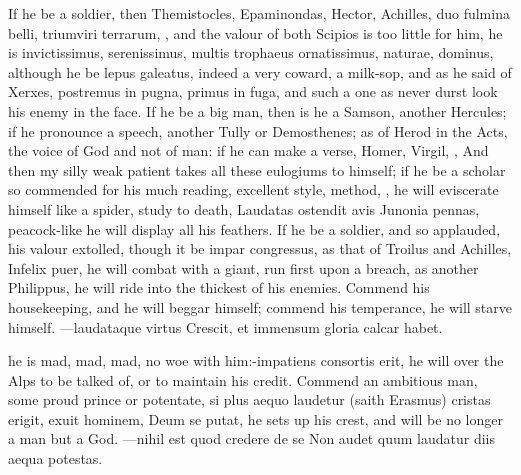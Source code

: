 {If he be a soldier, then Themistocles, Epaminondas, Hector, Achilles,
duo fulmina belli, triumviri terrarum, \etc{}, and the valour of both
Scipios is too little for him, he is invictissimus, serenissimus,
multis trophaeus ornatissimus, naturae, dominus, although he be lepus
galeatus, indeed a very coward, a milk-sop, and as he said of
Xerxes, postremus in pugna, primus in fuga, and such a one as never
durst look his enemy in the face. If he be a big man, then is he a
Samson, another Hercules; if he pronounce a speech, another Tully or
Demosthenes; as of Herod in the Acts, the voice of God and not of man:
if he can make a verse, Homer, Virgil, \etc{}, And then my silly weak
patient takes all these eulogiums to himself; if he be a scholar so
commended for his much reading, excellent style, method, \etc{}, he will
eviscerate himself like a spider, study to death, Laudatas ostendit
avis Junonia pennas, peacock-like he will display all his feathers. If
he be a soldier, and so applauded, his valour extolled, though it be
impar congressus, as that of Troilus and Achilles, Infelix puer, he
will combat with a giant, run first upon a breach, as another
Philippus, he will ride into the thickest of his enemies. Commend
his housekeeping, and he will beggar himself; commend his temperance,
he will starve himself.
---laudataque virtus
Crescit, et immensum gloria calcar habet.

he is mad, mad, mad, no woe with him:-impatiens consortis erit, he will
over the Alps to be talked of, or to maintain his credit. Commend
an ambitious man, some proud prince or potentate, si plus aequo
lau\-de\-tur (saith Erasmus) cristas erigit, exuit hominem, Deum se
putat, he sets up his crest, and will be no longer a man but a God.
---nihil est quod credere de se
Non audet quum laudatur diis aequa potestas.

}
